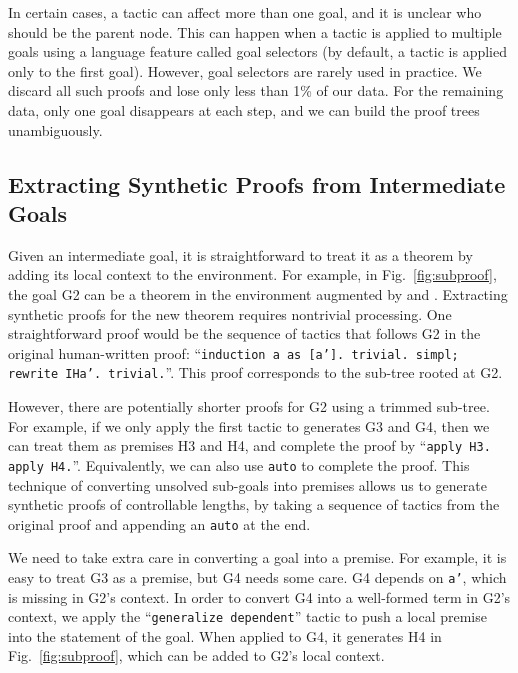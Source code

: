 \documentclass{article}
\begin{document}
In certain cases, a tactic can affect more than one goal, and it is unclear who should be the parent node. This can happen when a tactic is applied to multiple goals using a language feature called goal selectors (by default, a tactic is applied only to the first goal). 
However, goal selectors are rarely used in practice.
We discard all such proofs and lose only less than 1\% of our data.
For the remaining data, only one goal disappears at each step, and we can build the proof trees unambiguously.


\subsection{Extracting Synthetic Proofs from Intermediate Goals}




Given an intermediate goal, it is straightforward to treat it as a theorem by adding its local context to the environment.
For example, in Fig.~\ref{fig:subproof}, the goal G2 can be a theorem  in the environment augmented by   and .
Extracting synthetic proofs for the new theorem requires nontrivial processing.
One straightforward proof would be the sequence of tactics that follows G2 in the original human-written proof: ``\texttt{induction a as [a']. trivial. simpl; rewrite IHa'. trivial.}''. This proof corresponds to the sub-tree rooted at G2.

However, there are potentially shorter proofs for G2 using a trimmed sub-tree.
For example, if we only apply the first tactic to generates G3 and G4,
then we can treat them as premises H3 and H4, and complete the proof by ``\texttt{apply H3. apply H4.}''. Equivalently, we can also use \texttt{auto} to complete the proof.
This technique of converting unsolved sub-goals into premises allows us to generate synthetic proofs of controllable lengths, by taking a sequence of tactics from the original proof and appending an \texttt{auto} at the end.


We need to take extra care in converting a goal into a premise. For example, it is easy to treat G3 as a premise, but G4 needs some care.
G4 depends on \texttt{a'}, which is missing in G2's context.
In order to convert G4 into a well-formed term in G2's context,
we apply the ``\texttt{generalize dependent}'' tactic to push a local premise into the statement of the goal.
When applied to G4, it generates H4 in Fig.~\ref{fig:subproof}, which can be added to G2's local context.
\end{document}
